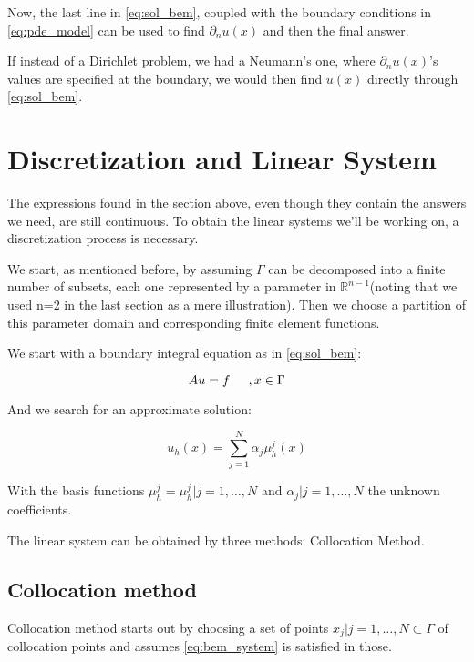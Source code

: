 Now, the last line in \ref{eq:sol_bem}, coupled with the boundary conditions in \ref{eq:pde_model} can be used to find $\partial_{n}u(x)$ and then the final answer.

If instead of a Dirichlet problem, we had a Neumann's one, where $\partial_{n}u(x)$'s values are specified at the boundary, we would then find $u(x)$ directly through \ref{eq:sol_bem}.

\section{Discretization and Linear System}

The expressions found in the section above, even though they contain the answers we need, are still continuous. To obtain the linear systems we'll be working on, a discretization process is necessary.

We start, as mentioned before, by assuming $\Gamma$ can be decomposed into a finite number of subsets, each one represented by a parameter in $\mathbb{R}^{n-1}$(noting that we used n=2 in the last section as a mere illustration). Then we choose a partition of this parameter domain and corresponding finite element functions.

We start with a boundary integral equation as in \ref{eq:sol_bem}:

\begin{equation}\label{eq:bem_system}
    Au = f \hspace{0.2in}, x \in \Gamma
\end{equation}

And we search for an approximate solution:

\begin{equation}\label{eq:approx_sol}
    u_{h}(x) = \sum_{j=1}^{N}\alpha_{j} \mu_{h}^{j}(x)
\end{equation}

With the basis functions $\mu_{h}^{j}={\mu_{h}^{j}|j=1, \dots, N}$ and ${\alpha_{j}|j=1, \dots, N}$ the unknown coefficients.

The linear system can be obtained by three methods: Collocation Method.


\subsection{Collocation method}

Collocation method starts out by choosing a set of points ${x_{j}|j=1, \dots, N} \subset \Gamma$ of collocation points and assumes \ref{eq:bem_system} is satisfied in those.

